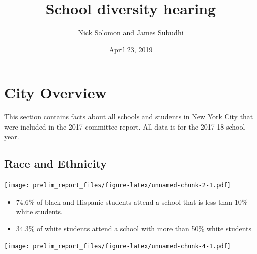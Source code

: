 \documentclass[11pt,]{article}
\title{School diversity hearing}
\author{Nick Solomon and James Subudhi}
\date{April 23, 2019}
\providecommand{\tightlist}{%
  \setlength{\itemsep}{0pt}\setlength{\parskip}{0pt}}
\begin{document}
\maketitle
\thispagestyle{fancy}

\hypertarget{city-overview}{%
\section{City Overview}\label{city-overview}}

This section contains facts about all schools and students in New York City that were included in the 2017 committee report. All data is for the 2017-18 school year.

\hypertarget{race-and-ethnicity}{%
\subsection{Race and Ethnicity}\label{race-and-ethnicity}}

\texttt{[image: prelim\_report\_files/figure-latex/unnamed-chunk-2-1.pdf]}
\begin{itemize}
\tightlist
\item
  74.6\% of black and Hispanic students attend a school that is less than 10\% white students.
\item
  34.3\% of white students attend a school with more than 50\% white students
\end{itemize}
\texttt{[image: prelim\_report\_files/figure-latex/unnamed-chunk-4-1.pdf]}
\end{document}
